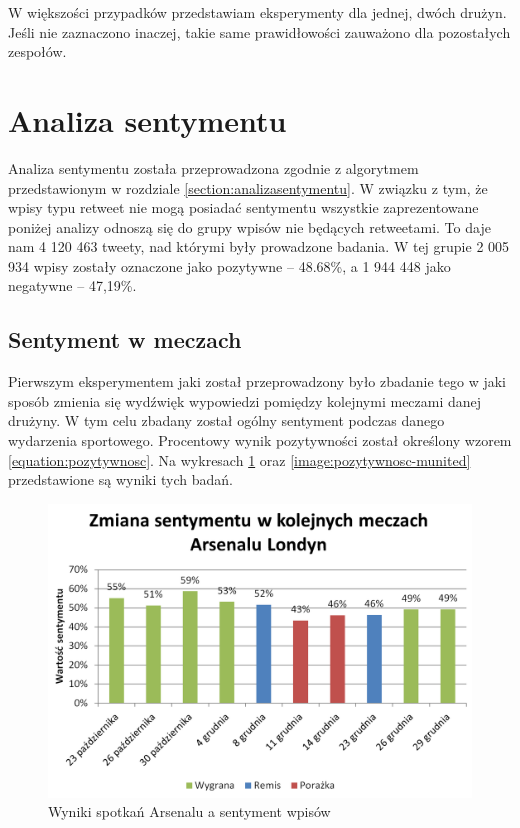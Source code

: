 W większości przypadków przedstawiam eksperymenty dla jednej, dwóch drużyn.
Jeśli nie zaznaczono inaczej, takie same prawidłowości zauważono dla
pozostałych zespołów.






\section{Analiza sentymentu}
\label{section:analizasentymentu2}

Analiza sentymentu została przeprowadzona zgodnie z algorytmem przedstawionym w
rozdziale \ref{section:analizasentymentu}. W związku z tym, że wpisy typu
retweet nie mogą posiadać sentymentu wszystkie zaprezentowane poniżej analizy
odnoszą się do grupy wpisów nie będących retweetami. To daje nam 4 120 463
tweety, nad którymi były prowadzone badania. W tej grupie 2 005 934 wpisy
zostały oznaczone jako pozytywne -- 48.68\%, a 1 944 448 jako negatywne --
47,19\%.



\subsection{Sentyment w meczach}
\label{subsection:sentymentwmeczach}
Pierwszym eksperymentem jaki został przeprowadzony było zbadanie tego w jaki 
sposób zmienia się wydźwięk wypowiedzi pomiędzy kolejnymi meczami danej drużyny.
W tym celu zbadany został ogólny sentyment podczas danego wydarzenia sportowego.
Procentowy wynik pozytywności został określony wzorem \ref{equation:pozytywnosc}.
Na wykresach \ref{image:pozytywnosc-arsenal} oraz 
\ref{image:pozytywnosc-munited} przedstawione są wyniki tych badań.

\clearpage

\begin{figure}[ht!]
\centering
\includegraphics[width=120mm]{img/pozytywnosc-arsenal2.png}
\caption{Wyniki spotkań Arsenalu a sentyment wpisów}
\label{image:pozytywnosc-arsenal}
\end{figure}

